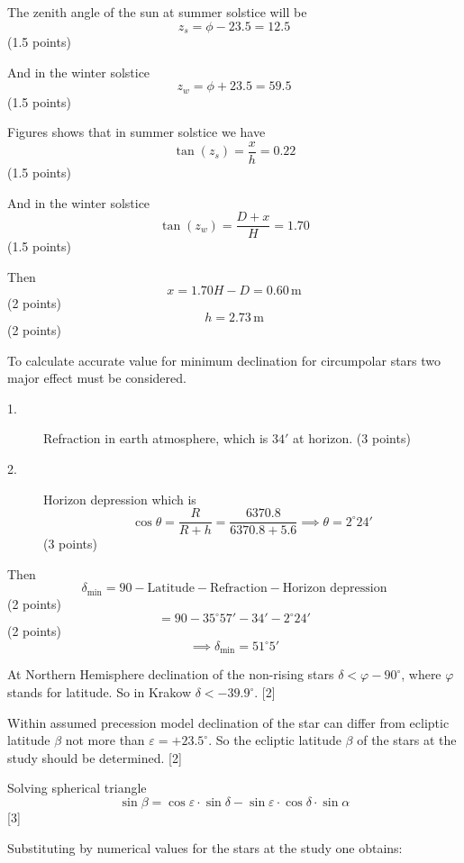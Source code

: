 The zenith angle of the sun at summer solstice will be
\[
  z_s = \phi - 23.5 = 12.5
\]
\hfill(1.5 points)

And in the winter solstice
\[
  z_w = \phi + 23.5 = 59.5
\]
\hfill(1.5 points)

Figures shows that in summer solstice we have
\[
  \tan(z_s) = \frac{x}{h} = 0.22
\]
\hfill(1.5 points)

And in the winter solstice
\[
  \tan(z_w) = \frac{D + x}{H} = 1.70
\]
\hfill(1.5 points)

Then
\[
  x = 1.70H - D = 0.60\,\mathrm{m}
\]
\hfill(2 points)
\[
  h = 2.73\,\mathrm{m}
\]
\hfill(2 points)


To calculate accurate value for minimum declination for circumpolar stars two
major effect must be considered.

\begin{description}
\item[1.] Refraction in earth atmosphere, which is $34'$ at horizon.
  \hfill(3 points)
\item[2.] Horizon depression which is
  \[
    \cos\theta = \frac{R}{R + h} = \frac{6370.8}{6370.8 + 5.6}
    \implies \theta = 2^\circ 24'
  \]
  \hfill(3 points)
\end{description}

Then
\[
  \delta_{\min} = 90 - \text{Latitude} - \text{Refraction}
    - \text{Horizon depression}
\]
\hfill(2 points)
\[
  = 90 - 35^\circ 57' - 34' - 2^\circ 24'
\]
\hfill(2 points)
\[
  \implies \delta_{\min} = 51^\circ 5'
\]


At Northern Hemisphere declination of the non-rising stars
$\delta < \varphi - 90^\circ$, where $\varphi$ stands for latitude. So in
Krakow $\delta < -39.9^\circ$. \hfill[2]

Within assumed precession model declination of the star can differ from
ecliptic latitude $\beta$ not more than $\varepsilon = +23.5^\circ$. So the
ecliptic latitude $\beta$ of the stars at the study should be determined.
\hfill[2]

Solving spherical triangle
\[
  \sin\beta = \cos\varepsilon\cdot\sin\delta
    - \sin\varepsilon\cdot\cos\delta\cdot\sin\alpha
\]
\hfill[3]

Substituting by numerical values for the stars at the study one obtains:

